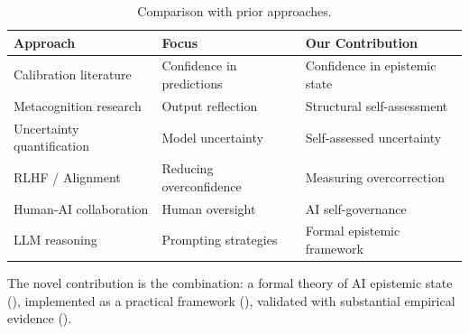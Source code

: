 \begin{table}[h]
\centering
\begin{tabular}{lll}
\toprule
\textbf{Approach} & \textbf{Focus} & \textbf{Our Contribution} \\
\midrule
Calibration literature & Confidence in predictions & Confidence in epistemic state \\
Metacognition research & Output reflection & Structural self-assessment \\
Uncertainty quantification & Model uncertainty & Self-assessed uncertainty \\
RLHF / Alignment & Reducing overconfidence & Measuring overcorrection \\
Human-AI collaboration & Human oversight & AI self-governance \\
LLM reasoning & Prompting strategies & Formal epistemic framework \\
\bottomrule
\end{tabular}
\caption{Comparison with prior approaches.}
\label{tab:related-work-comparison}
\end{table}

The novel contribution is the combination: a formal theory of AI epistemic state (), implemented as a practical framework (), validated with substantial empirical evidence ().
